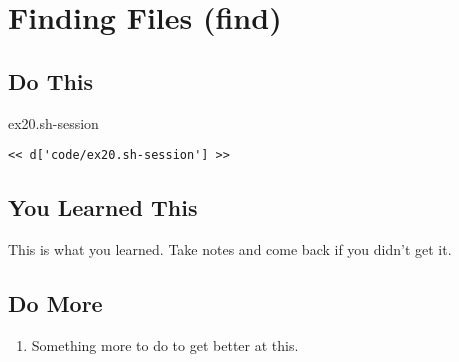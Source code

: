 \chapter{Finding Files (find)}

\section{Do This}

\begin{code}{ex20.sh-session}
\begin{Verbatim}
<< d['code/ex20.sh-session'] >>
\end{Verbatim}
\end{code}


\section{You Learned This}

This is what you learned.  Take notes and come back if you didn't get it.

\section{Do More}

\begin{enumerate}
\item Something more to do to get better at this.
\end{enumerate}

